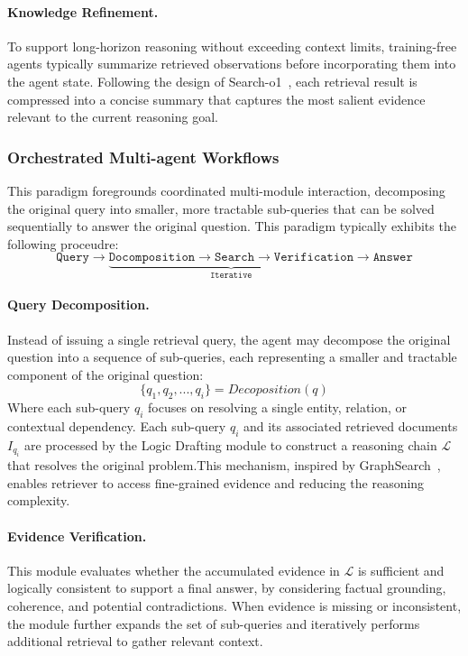 \paragraph{\textbf{Knowledge Refinement}.}
To support long-horizon reasoning without exceeding context limits, training-free agents typically summarize retrieved observations before incorporating them into the agent state. Following the design of Search-o1~\cite{li2025searcho1}, each retrieval result is compressed into a concise summary that captures the most salient evidence relevant to the current reasoning goal. 
\subsubsection{Orchestrated Multi-agent Workflows}
This paradigm foregrounds coordinated multi-module interaction, decomposing the original query into smaller, more tractable sub-queries that can be solved sequentially to answer the original question. This paradigm typically exhibits the following proceudre:
\[
\texttt{Query} \rightarrow
\underbrace{\texttt{Docomposition} \rightarrow \texttt{Search} \rightarrow \texttt{Verification}}_{\texttt{Iterative}}
\rightarrow \texttt{Answer}
\]
\paragraph{\textbf{Query Decomposition}.}
Instead of issuing a single retrieval query, the agent may decompose the original question into a sequence of sub-queries,  each representing a smaller and tractable component of the original question:
\begin{equation}
    \{q_1, q_2,...,q_i\} = Decoposition(q)
\end{equation}
Where each sub-query $q_i$ focuses on resolving a single entity, relation, or contextual dependency. Each sub-query $q_i$ and its associated retrieved documents $I_{q_i}$ are processed by the Logic Drafting module to construct a reasoning chain $\mathcal{L}$ that resolves the original problem.This mechanism, inspired by GraphSearch~\cite{yang2025graphsearch}, enables retriever to access fine-grained evidence and reducing the reasoning complexity.
\paragraph{\textbf{Evidence Verification}.}
 This module evaluates whether the accumulated evidence in $\mathcal{L}$ is sufficient and logically consistent to support a final answer, by considering factual grounding, coherence, and potential contradictions. When evidence is missing or inconsistent, the module further expands the set of sub-queries and iteratively performs additional retrieval to gather relevant context.

